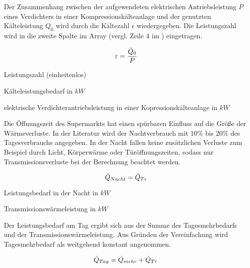 Der Zusammenhang zwischen der aufgewendeten elektrischen Antriebsleistung $P$
eines Verdichters in einer Kompressionskälteanlage und der genutzten
Kälteleistung ${\dot{Q}}_0$ wird durch die Kältezahl $\epsilon$ wiedergegeben.
Die Leistungszahl wird in die zweite Spalte im Array (vergl. Zeile 4 im
) eingetragen.

\begin{equation}
	\epsilon = \frac{\pkalt}{P}
\label{epsilon}
\end{equation}

\begin{description}[\dth]

	\item[$\epsilon$] Leistungszahl (einheitenlos)
	\item[$\pkalt$] Kälteleistungsbedarf in $kW$
	\item[$P$] elektrische Verdichterantriebsleistung in einer
		Kopressionskälteanlage in $kW$

\end{description}
\vspace{0.5cm}

Die Öffnungszeit des Supermarkts hat einen spürbaren Einfluss auf die Größe der
Wärmeverluste. In der Literatur wird der Nachtverbrauch mit $10\%$ bis $20\%$
des Tagesverbrauchs angegeben\cite{kauffeld}.  In der Nacht fallen keine
zusätzlichen Verluste zum Beispiel durch Licht, Körperwärme oder
Türöffnungszeiten, sodass nur Transmissionsverluste bei der Berechnung beachtet
werden.

\begin{equation}
	\dot{Q}_{Nacht}=\ptrans
\label{pnacht}
\end{equation}

\begin{description}[\dth]

	\item[$\pnacht$] Leistungsbedarf in der Nacht in $kW$
	\item[$\ptrans$] Transmissionswärmeleistung in $kW$

\end{description}
\vspace{0.5cm}


Der Leistungsbedarf am Tag ergibt sich aus der Summe des Tagesmehrbedarfs und
der Transmissionswärmeleistung. Aus Gründen der Vereinfachung wird
Tagesmehrbedarf als weitgehend konstant angenommen.

\begin{equation}
	\ptag = \pmehr + \ptrans
\label{ptag}
\end{equation}

